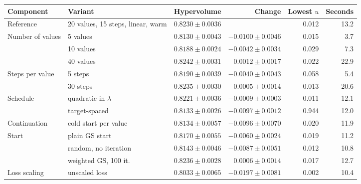 \begin{tabular}{@{}llrrrr@{}}
\toprule
Component & Variant & Hypervolume & Change & Lowest $u$ & Seconds \\
\midrule
Reference & 20 values, 15 steps, linear, warm & $0.8230\pm0.0036$ &  & 0.012 & 13.2 \\
Number of values & 5 values & $0.8130\pm0.0043$ & $-0.0100\pm0.0046$ & 0.015 & 3.7 \\
 & 10 values & $0.8188\pm0.0024$ & $-0.0042\pm0.0034$ & 0.029 & 7.3 \\
 & 40 values & $0.8242\pm0.0031$ & $0.0012\pm0.0017$ & 0.022 & 22.9 \\
Steps per value & 5 steps & $0.8190\pm0.0039$ & $-0.0040\pm0.0043$ & 0.058 & 5.4 \\
 & 30 steps & $0.8235\pm0.0030$ & $0.0005\pm0.0014$ & 0.013 & 20.6 \\
Schedule & quadratic in $\lambda$ & $0.8221\pm0.0036$ & $-0.0009\pm0.0003$ & 0.011 & 12.1 \\
 & target-spaced & $0.8133\pm0.0026$ & $-0.0097\pm0.0012$ & 0.944 & 12.0 \\
Continuation & cold start per value & $0.8134\pm0.0057$ & $-0.0096\pm0.0070$ & 0.020 & 11.9 \\
Start & plain GS start & $0.8170\pm0.0055$ & $-0.0060\pm0.0024$ & 0.019 & 11.2 \\
 & random, no iteration & $0.8143\pm0.0046$ & $-0.0087\pm0.0051$ & 0.012 & 10.8 \\
 & weighted GS, 100 it. & $0.8236\pm0.0028$ & $0.0006\pm0.0014$ & 0.017 & 12.7 \\
Loss scaling & unscaled loss & $0.8033\pm0.0065$ & $-0.0197\pm0.0081$ & 0.002 & 10.4 \\
\bottomrule
\end{tabular}
